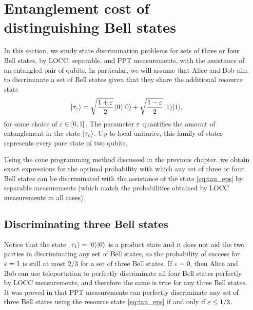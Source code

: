 \section{Entanglement cost of distinguishing Bell states}

In this section, we study state discrimination problems for sets of three or
four Bell states, by LOCC, separable, and PPT measurements, with the assistance
of an entangled pair of qubits.
In particular, we will assume that Alice and Bob aim to discriminate a set of
Bell states given that they share the additional resource state
\begin{equation}
  \label{eq:tau_eps}
  \lvert\mspace{0.5mu} \tau_{\varepsilon} \mspace{0.5mu} \rangle = \sqrt{\frac{1 + \varepsilon}{2}}\,\lvert\mspace{0.5mu} 0 \mspace{0.5mu} \rangle\lvert\mspace{0.5mu} 0 \mspace{0.5mu} \rangle + 
  \sqrt{\frac{1 - \varepsilon}{2}}\,\lvert\mspace{0.5mu} 1 \mspace{0.5mu} \rangle\lvert\mspace{0.5mu} 1 \mspace{0.5mu} \rangle,
\end{equation}
for some choice of $\varepsilon \in [0,1]$.
The parameter $\varepsilon$ quantifies the amount of entanglement in the state
$\lvert\mspace{0.5mu} \tau_{\varepsilon} \mspace{0.5mu} \rangle$.
Up to local unitaries, this family of states represents every pure state of two
qubits.

Using the cone programming method discussed in the previous chapter, we obtain
exact expressions for the optimal probability with which any set of three or
four Bell states can be discriminated with the assistance of the state
\eqref{eq:tau_eps} by separable measurements (which match the probabilities
obtained by LOCC measurements in all cases).

\subsection{Discriminating three Bell states}

Notice that the state $\lvert\mspace{0.5mu} \tau_{1} \mspace{0.5mu} \rangle = \lvert\mspace{0.5mu} 0 \mspace{0.5mu} \rangle\lvert\mspace{0.5mu} 0 \mspace{0.5mu} \rangle$ is a product state and
it does not aid the two parties in discriminating any set of Bell states,
so the probability of success for $\varepsilon = 1$ is still at most $2/3$ for a set
of three Bell states.
If $\varepsilon = 0$, then Alice and Bob can use teleportation to perfectly
discriminate all four Bell states perfectly by LOCC measurements, and therefore
the same is true for any three Bell states.
It was proved in \cite{Yu14} that PPT measurements can perfectly
discriminate any set of three Bell states using the resource state
\eqref{eq:tau_eps} if and only if $\varepsilon \leq 1/3$.


